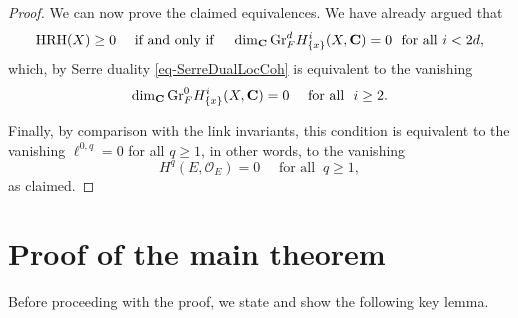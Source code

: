 \documentclass[letterpaper,11pt]{amsart}
\theoremstyle{plain}
\theoremstyle{definition}
\theoremstyle{remark}
\def\C{{\mathbf C}}
\def\cO{\mathcal{O}}
\begin{document}
\begin{proof}
We can now prove the claimed equivalences. We have already argued that
\[ {\rm HRH}(X) \geq 0 \quad \text{ if and only if } \quad \dim_{\C} {\rm Gr}_F^{d} H^i_{\{x\}}(X,\C) = 0\ \text{ for all } i < 2d,\]
which, by Serre duality \eqref{eq-SerreDualLocCoh} is equivalent to the vanishing
\[\dim_{\C} {\rm Gr}_F^{0} H^i_{\{x\}}(X,\C) = 0\quad \text{ for all }\ i \geq 2.\]

Finally, by comparison with the link invariants, this condition is equivalent to the vanishing $\ell^{0,q} = 0$ for all $q\geq 1$, in other words, to the vanishing
\[ H^q(E,\cO_E) = 0\quad \text{ for all }\ q \geq 1,\]
as claimed.
\end{proof}


\section{Proof of the main theorem}
Before proceeding with the proof, we state and show the following key lemma.
\end{document}
